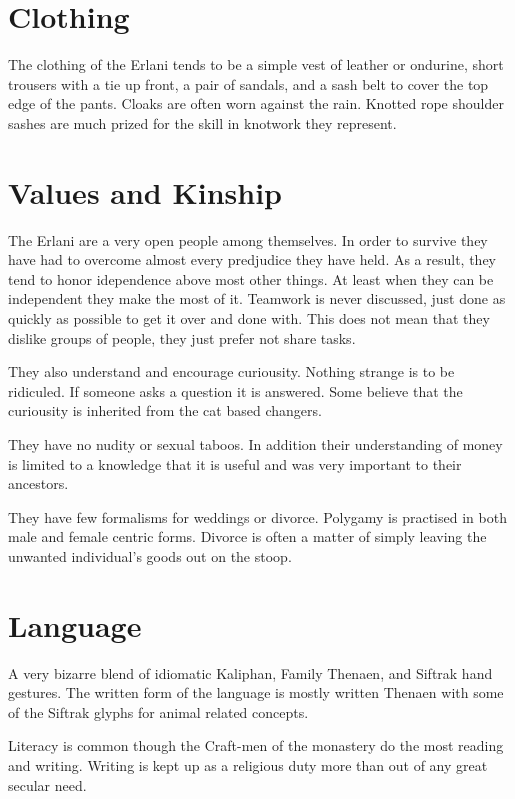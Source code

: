 \section{Clothing}

The clothing of the Erlani tends to be a simple vest of leather or 
ondurine, short trousers with a tie up front, a pair of sandals, and
a sash belt to cover the top edge of the pants. Cloaks are often  worn against
the rain. Knotted rope shoulder sashes are much prized for the skill in
knotwork they represent.

\section{Values and Kinship}

The Erlani are a very open people among themselves. In order to survive
they have had to overcome almost every predjudice they have held. As a
result, they tend to honor idependence above most other things. At
least when they can be independent they make the most of it. Teamwork is
never discussed, just done as quickly as possible to get it over and
done with. This does not mean that they dislike groups of people, they
just prefer not share tasks.

They also understand and encourage curiousity. Nothing strange is to
be ridiculed. If someone asks a question it is answered. Some believe
that the curiousity is inherited from the cat based changers.

They have no nudity or sexual taboos. In addition their understanding
of money is limited to a knowledge that it is useful and was very
important to their ancestors.

They have few formalisms for weddings or divorce. Polygamy is practised
in both male and female centric forms. Divorce is often a matter of 
simply leaving the unwanted individual's goods out on the stoop. 

\section{Language}

A very bizarre blend of idiomatic Kaliphan, Family Thenaen, and
Siftrak hand gestures. The written form of the language is mostly 
written Thenaen with some of the Siftrak glyphs for animal related concepts.

Literacy is common though the Craft-men of the monastery do the most reading
and writing. Writing is kept up as a religious duty more than out of any great 
secular need.

